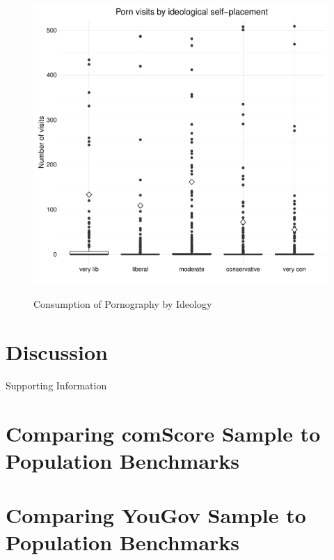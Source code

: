 \documentclass[12pt, letterpaper]{article}
\begin{document}
\begin{figure}[h]
\centering
\caption{Consumption of Pornography by Ideology}
\includegraphics[scale=.75]{../figs/ideo_boxplot_shalla.pdf}
\label{fig:summary}
\end{figure}

\section*{Discussion}

\clearpage


\clearpage
\appendix
\renewcommand{\thesection}{SI \arabic{section}}
\renewcommand\thetable{\thesection.\arabic{table}}  
\renewcommand\thefigure{\thesection.\arabic{figure}}

\begin{center}
\Large{Supporting Information}
\end{center}


\section{Comparing comScore Sample to Population Benchmarks}
\label{si1_comscore}


\clearpage
\section{Comparing YouGov Sample to Population Benchmarks}
\label{si2_yougov}


\end{document}
